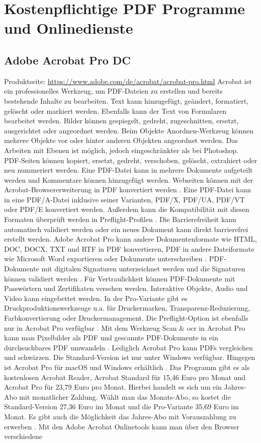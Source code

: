 \section{Kostenpflichtige PDF Programme und Onlinedienste}

\subsection{Adobe Acrobat Pro DC}
Produktseite: \url{https://www.adobe.com/de/acrobat/acrobat-pro.html}
Acrobat ist ein professionelles Werkzeug, um PDF-Dateien zu erstellen und bereits bestehende Inhalte zu bearbeiten. Text kann hinzugefügt, geändert, formatiert, gelöscht oder markiert werden. Ebenfalls kann der Text von Formularen bearbeitet werden. Bilder können gespiegelt, gedreht, zugeschnitten, ersetzt, ausgerichtet oder angeordnet werden. Beim Objekte Anordnen-Werkzeug können mehrere Objekte vor oder hinter anderen Objekten angeordnet werden. Das Arbeiten mit Ebenen ist möglich, jedoch eingeschränkter als bei Photoshop. PDF-Seiten können kopiert, ersetzt, gedreht, verschoben, gelöscht, extrahiert oder neu nummeriert werden. Eine PDF-Datei kann in mehrere Dokumente aufgeteilt werden und Kommentare können hinzugefügt werden. Webseiten können mit der Acrobat-Browsererweiterung in PDF konvertiert werden \cite{adobe-acrobat-um}. Eine PDF-Datei kann in eine PDF/A-Datei inklusive seiner Varianten, PDF/X, PDF/UA, PDF/VT oder PDF/E konvertiert werden. Außerdem kann die Kompatibilität mit diesen Formaten überprüft werden in Preflight-Profilen \cite{adobe-pdf-a}. Die Barrierefreiheit kann automatisch validiert werden oder ein neues Dokument kann direkt barrierefrei erstellt werden. Adobe Acrobat Pro kann andere Dokumentenformate wie HTML, DOC, DOCX, TXT und RTF in PDF konvertieren, PDF in andere Dateiformate wie Microsoft Word exportieren oder Dokumente unterschreiben \cite{adobe-formate}. PDF-Dokumente mit digitalen Signaturen unterzeichnet werden und die Signaturen können validiert werden \cite{adobe-acrobat}. Für Vertraulichkeit können PDF-Dokumente mit Passwörtern und Zertifikaten versehen werden. Interaktive Objekte, Audio und Video kann eingebettet werden. In der Pro-Variante gibt es Druckproduktionswerkzeuge u.a. für Druckermarken, Transparenz-Reduzierung, Farbkonvertierung oder Druckermanagement. Die Preflight-Option ist ebenfalls nur in Acrobat Pro verfügbar \cite{adobe-acrobat-um}. Mit dem Werkzeug Scan \& \gls{ocr} in Acrobat Pro kann man Pixelbilder als PDF und gescannte PDF-Dokumente in ein durchsuchbares PDF umwandeln \cite{adobe-search}. Lediglich Acrobat Pro kann PDFs vergleichen und schwärzen. Die Standard-Version ist nur unter Windows verfügbar. Hingegen ist Acrobat Pro für macOS und Windows erhältlich \cite{wondershare-acrobat}. Das Programm gibt es als kostenlosen Acrobat Reader, Acrobat Standard für 15,46 Euro pro Monat und Acrobat Pro für 23,79 Euro pro Monat. Hierbei handelt es sich um ein Jahres-Abo mit monatlicher Zahlung. Wählt man das Monats-Abo, so kostet die Standard-Version 27,36 Euro im Monat und die Pro-Variante 35,69 Euro im Monat. Es gibt auch die Möglichkeit das Jahres-Abo mit Vorauszahlung zu erwerben \cite{adobe-acrobat}. Mit den Adobe Acrobat Onlinetools kann man über den Browser verschiedene 